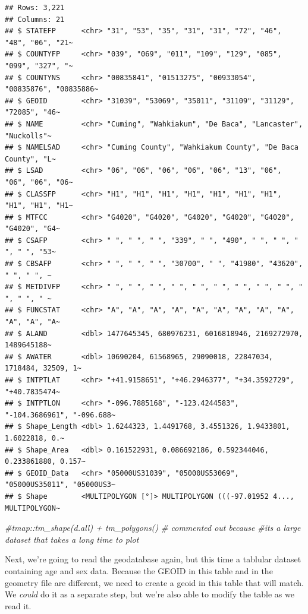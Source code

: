 \documentclass[
]{article}
\newenvironment{Shaded}{\begin{snugshade}}{\end{snugshade}}
\newcommand{\CommentTok}[1]{\textcolor[rgb]{0.56,0.35,0.01}{\textit{#1}}}
\begin{document}
\begin{verbatim}
## Rows: 3,221
## Columns: 21
## $ STATEFP      <chr> "31", "53", "35", "31", "31", "72", "46", "48", "06", "21~
## $ COUNTYFP     <chr> "039", "069", "011", "109", "129", "085", "099", "327", "~
## $ COUNTYNS     <chr> "00835841", "01513275", "00933054", "00835876", "00835886~
## $ GEOID        <chr> "31039", "53069", "35011", "31109", "31129", "72085", "46~
## $ NAME         <chr> "Cuming", "Wahkiakum", "De Baca", "Lancaster", "Nuckolls"~
## $ NAMELSAD     <chr> "Cuming County", "Wahkiakum County", "De Baca County", "L~
## $ LSAD         <chr> "06", "06", "06", "06", "06", "13", "06", "06", "06", "06~
## $ CLASSFP      <chr> "H1", "H1", "H1", "H1", "H1", "H1", "H1", "H1", "H1", "H1~
## $ MTFCC        <chr> "G4020", "G4020", "G4020", "G4020", "G4020", "G4020", "G4~
## $ CSAFP        <chr> " ", " ", " ", "339", " ", "490", " ", " ", " ", " ", "53~
## $ CBSAFP       <chr> " ", " ", " ", "30700", " ", "41980", "43620", " ", " ", ~
## $ METDIVFP     <chr> " ", " ", " ", " ", " ", " ", " ", " ", " ", " ", " ", " ~
## $ FUNCSTAT     <chr> "A", "A", "A", "A", "A", "A", "A", "A", "A", "A", "A", "A~
## $ ALAND        <dbl> 1477645345, 680976231, 6016818946, 2169272970, 1489645188~
## $ AWATER       <dbl> 10690204, 61568965, 29090018, 22847034, 1718484, 32509, 1~
## $ INTPTLAT     <chr> "+41.9158651", "+46.2946377", "+34.3592729", "+40.7835474~
## $ INTPTLON     <chr> "-096.7885168", "-123.4244583", "-104.3686961", "-096.688~
## $ Shape_Length <dbl> 1.6244323, 1.4491768, 3.4551326, 1.9433801, 1.6022818, 0.~
## $ Shape_Area   <dbl> 0.161522931, 0.086692186, 0.592344046, 0.233861880, 0.157~
## $ GEOID_Data   <chr> "05000US31039", "05000US53069", "05000US35011", "05000US3~
## $ Shape        <MULTIPOLYGON [°]> MULTIPOLYGON (((-97.01952 4..., MULTIPOLYGON~
\end{verbatim}

\begin{Shaded}
\begin{Highlighting}[]
\CommentTok{\#tmap::tm\_shape(d.all) + tm\_polygons() \# commented out because }
\CommentTok{\#it\textquotesingle{}s a large dataset that takes a long time to plot}
\end{Highlighting}
\end{Shaded}

Next, we're going to read the geodatabase again, but this time a
tablular dataset containing age and sex data. Because the GEOID in this
table and in the geometry file are different, we need to create a geoid
in this table that will match. We \emph{could} do it as a separate step,
but we're also able to modify the table as we read it.
\end{document}
